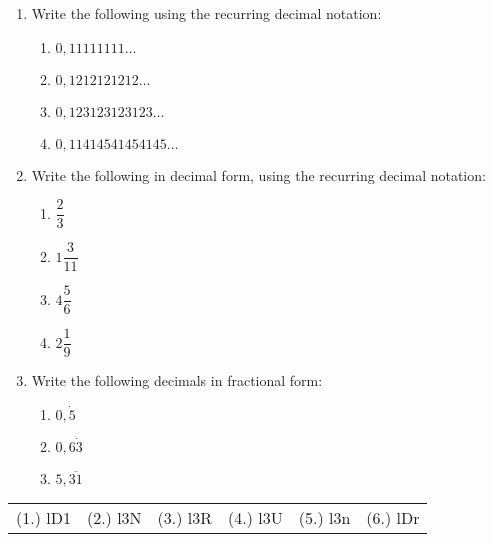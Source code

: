 \begin{exercises}{}
{\begin{enumerate}[itemsep=5pt, label=\textbf{\arabic*}. ]
% 
\item Write the following using the recurring decimal notation:
    \begin{enumerate}[itemsep=5pt, label=\textbf{(\alph*)} ] 
    \item $0,11111111\ldots$
    \item $0,1212121212\ldots$
    \item $0,123123123123\ldots$
    \item $0,11414541454145\ldots$
    \end{enumerate}
\item Write the following in decimal form, using the recurring decimal notation:
    \begin{enumerate}[itemsep=5pt, label=\textbf{(\alph*)} ] 
    \item $\dfrac{2}{3}$
    \item $1\dfrac{3}{11}$
    \item $4\dfrac{5}{6}$
    \item $2\dfrac{1}{9}$
    \end{enumerate}
\item Write the following decimals in fractional form:
    \begin{enumerate}[itemsep=5pt, label=\textbf{(\alph*)} ] 
    \item $0,\dot{5}$
    \item $0,6\dot{3}$
    \item $5,\overline{31}$
    \end{enumerate}
\end{enumerate}
\practiceinfo 
\par 
 \par \begin{tabular}[h]{cccccc}
 (1.) lD1  &  (2.) l3N  &  (3.) l3R  & (4.) l3U & (5.) l3n & (6.) lDr \end{tabular}
}
\end{exercises}

